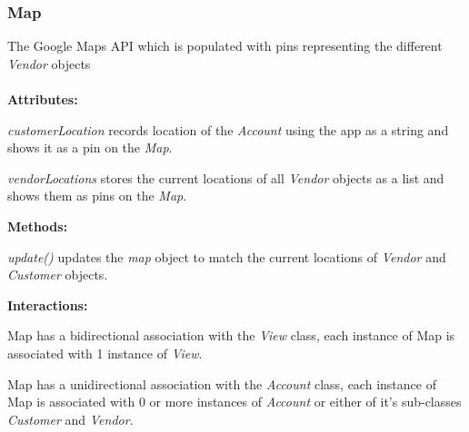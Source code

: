 \subsubsection{Map}
The Google Maps API which is populated with pins representing the different \emph{Vendor} objects \\ \\
\textbf{Attributes:}
\begin{description}
\item\textit{customerLocation} records location of the \emph{Account} using the app as a string and shows it as a pin on the \emph{Map}.
\item\textit{vendorLocations} stores the current locations of all \emph{Vendor} objects as a list and shows them as pins on the \emph{Map}.
\end{description}
\textbf{Methods:}
\begin{description}
\item\textit{update()} updates the \emph{map} object to match the current locations of \emph{Vendor} and \emph{Customer} objects.
\end{description}
\textbf{Interactions:}
\begin{description}
\item Map has a bidirectional association with the \emph{View} class, each instance of Map is associated with 1 instance of \emph{View}.
\item Map has a unidirectional association with the \emph{Account} class, each instance of Map is associated with 0 or more instances of \emph{Account} or either of it's sub-classes \emph{Customer} and \emph{Vendor}.
\end{description}
\vspace{.2cm}

